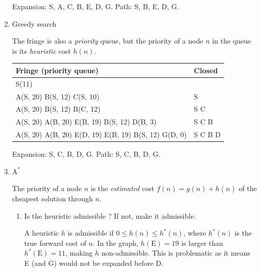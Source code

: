\documentclass[11pt, a4paper]{article}
\def\Astar{$\text{A}^*$}
\begin{document}
\begin{enumerate}
\begin{solution}
        Expansion: S, A, C, B, E, D, G. Path: S, B, E, D, G.
    \end{solution}

    \item Greedy search

    \begin{solution}
        The fringe is also a \emph{priority} queue, but the priority of a node $n$ in the queue is its \emph{heuristic} cost $h(n)$.

        \begin{table}[h]
            \centering
            \begin{tabular}{l|l}
                \toprule
                Fringe (priority queue) & Closed \\
                \midrule
                S(11) & \\
                A(S, 20) B(S, 12) C(S, 10) & S \\
                A(S, 20) B(S, 12) B(C, 12) & S C \\
                A(S, 20) A(B, 20) E(B, 19) B(S, 12) D(B, 3) & S C B \\
                A(S, 20) A(B, 20) E(D, 19) E(B, 19) B(S, 12) G(D, 0) & S C B D \\
                \bottomrule
            \end{tabular}
        \end{table}

        Expansion: S, C, B, D, G. Path: S, C, B, D, G.
    \end{solution}

    \item \Astar{}

    \begin{solution}
    The priority of a node $n$ is the \emph{estimated} cost $f(n) = g(n) + h(n)$ of the cheapest solution through $n$.
    \end{solution}

    \begin{enumerate}
        \item Is the heuristic admissible ? If not, make it admissible.

        \begin{solution}
            A heuristic $h$ is admissible if $0 \leq h(n) \leq h^*(n)$, where $h^*(n)$ is the true forward cost of $n$. In the graph, $h(\text{E}) = 19$ is larger than $h^*(\text{E}) = 11$, making $h$ non-admissible. This is problematic as it means E (and G) would not be expanded before D.


\end{solution}
\end{enumerate}
\end{enumerate}
\end{document}

